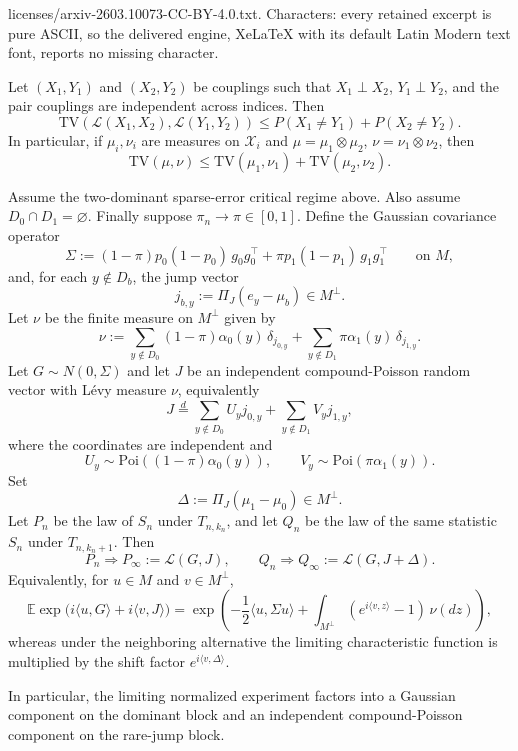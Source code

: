 \documentclass[10pt,a4paper]{amsart}
\begin{document}
licenses/arxiv-2603.10073-CC-BY-4.0.txt. Characters: every retained excerpt is pure ASCII, so the delivered engine, XeLaTeX with its default Latin Modern text font, reports no missing character.
\begin{lemma}
\label{lem:tv-tensorization}
Let $(X_1, Y_1)$ and $(X_2, Y_2)$ be couplings such that $X_1 \perp X_2$, $Y_1 \perp Y_2$, and the pair couplings
are independent across indices. Then
\[
\mathrm{TV}(\mathcal{L}(X_1, X_2), \mathcal{L}(Y_1, Y_2)) \leq P(X_1 \neq Y_1) + P(X_2 \neq Y_2).
\]
In particular, if $\mu_i, \nu_i$ are measures on $\mathcal{X}_i$ and $\mu = \mu_1 \otimes \mu_2$, $\nu = \nu_1 \otimes \nu_2$, then
\[
\mathrm{TV}(\mu, \nu) \leq \mathrm{TV}(\mu_1, \nu_1) + \mathrm{TV}(\mu_2, \nu_2).
\]
\end{lemma}

\begin{proposition}
\label{prop:hybrid-gaussian-compound-poisson}
Assume the two-dominant sparse-error critical regime above. Also assume
$D_0\cap D_1=\varnothing$. Finally suppose $\pi_n\to\pi\in[0,1]$. Define the Gaussian
covariance operator
\[
\Sigma:=(1-\pi)p_0(1-p_0)\,g_0g_0^{\top}+\pi p_1(1-p_1)\,g_1g_1^{\top}
\qquad \text{on } M,
\]
and, for each $y\notin D_b$, the jump vector
\[
j_{b,y}:=\Pi_J(e_y-\mu_b)\in M^\perp.
\]
Let $\nu$ be the finite measure on $M^\perp$ given by
\[
\nu
:=\sum_{y\notin D_0}(1-\pi)\alpha_0(y)\,\delta_{j_{0,y}}
 +\sum_{y\notin D_1}\pi\alpha_1(y)\,\delta_{j_{1,y}}.
\]
Let $G\sim N(0,\Sigma)$ and let $J$ be an independent compound-Poisson random vector with L\'evy measure
$\nu$, equivalently
\[
J\overset{d}=\sum_{y\notin D_0}U_y j_{0,y}+\sum_{y\notin D_1}V_y j_{1,y},
\]
where the coordinates are independent and
\[
U_y\sim \mathrm{Poi}((1-\pi)\alpha_0(y)),
\qquad
V_y\sim \mathrm{Poi}(\pi\alpha_1(y)).
\]
Set
\[
\Delta:=\Pi_J(\mu_1-\mu_0)\in M^\perp.
\]
Let $P_n$ be the law of $S_n$ under $T_{n,k_n}$, and let $Q_n$ be the law of the same statistic $S_n$
under $T_{n,k_n+1}$. Then
\[
P_n\Longrightarrow P_\infty:=\mathcal L(G,J),
\qquad
Q_n\Longrightarrow Q_\infty:=\mathcal L(G,J+\Delta).
\]
Equivalently, for $u\in M$ and $v\in M^\perp$,
\[
\mathbb E\exp\bigl(i\langle u,G\rangle+i\langle v,J\rangle\bigr)
=\exp\!\left(-\frac12\langle u,\Sigma u\rangle
+\int_{M^\perp}(e^{i\langle v,z\rangle}-1)\,\nu(dz)\right),
\]
whereas under the neighboring alternative the limiting characteristic function is multiplied by the shift factor
$e^{i\langle v,\Delta\rangle}$.

In particular, the limiting normalized experiment factors into a Gaussian component on the dominant block and an
independent compound-Poisson component on the rare-jump block.
\end{proposition}
\end{document}
